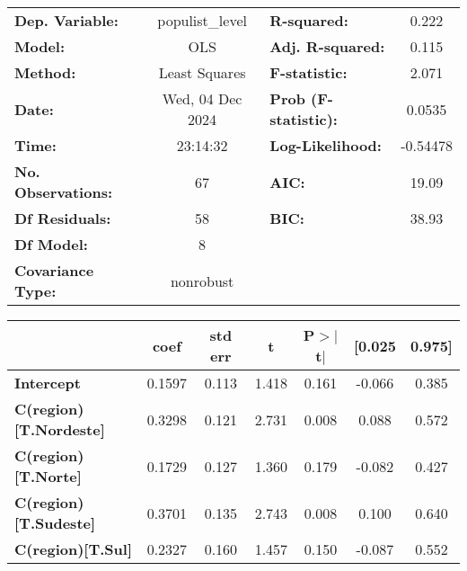 \begin{center}
\begin{tabular}{lclc}
\toprule
\textbf{Dep. Variable:}        & populist\_level  & \textbf{  R-squared:         } &     0.222   \\
\textbf{Model:}                &       OLS        & \textbf{  Adj. R-squared:    } &     0.115   \\
\textbf{Method:}               &  Least Squares   & \textbf{  F-statistic:       } &     2.071   \\
\textbf{Date:}                 & Wed, 04 Dec 2024 & \textbf{  Prob (F-statistic):} &   0.0535    \\
\textbf{Time:}                 &     23:14:32     & \textbf{  Log-Likelihood:    } &  -0.54478   \\
\textbf{No. Observations:}     &          67      & \textbf{  AIC:               } &     19.09   \\
\textbf{Df Residuals:}         &          58      & \textbf{  BIC:               } &     38.93   \\
\textbf{Df Model:}             &           8      & \textbf{                     } &             \\
\textbf{Covariance Type:}      &    nonrobust     & \textbf{                     } &             \\
\bottomrule
\end{tabular}
\begin{tabular}{lcccccc}
                               & \textbf{coef} & \textbf{std err} & \textbf{t} & \textbf{P$> |$t$|$} & \textbf{[0.025} & \textbf{0.975]}  \\
\midrule
\textbf{Intercept}             &       0.1597  &        0.113     &     1.418  &         0.161        &       -0.066    &        0.385     \\
\textbf{C(region)[T.Nordeste]} &       0.3298  &        0.121     &     2.731  &         0.008        &        0.088    &        0.572     \\
\textbf{C(region)[T.Norte]}    &       0.1729  &        0.127     &     1.360  &         0.179        &       -0.082    &        0.427     \\
\textbf{C(region)[T.Sudeste]}  &       0.3701  &        0.135     &     2.743  &         0.008        &        0.100    &        0.640     \\
\textbf{C(region)[T.Sul]}      &       0.2327  &        0.160     &     1.457  &         0.150        &       -0.087    &        0.552     \\

\end{tabular}
\end{center}
